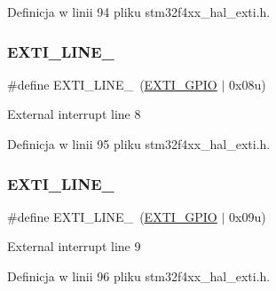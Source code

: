 Definicja w linii 94 pliku stm32f4xx\+\_\+hal\+\_\+exti.\+h.

\mbox{\label{group___e_x_t_i___line_ga0bb9322e3cfbe3a256f9e479ba3e5664}} 
\subsubsection{\texorpdfstring{E\+X\+T\+I\+\_\+\+L\+I\+N\+E\+\_}{EXTI\_LINE\_8}}
{\footnotesize\ttfamily \#define E\+X\+T\+I\+\_\+\+L\+I\+N\+E\+\_~(\hyperlink{group___e_x_t_i___private___constants_gacfa322960fc87db022536119cabb4d2a}{E\+X\+T\+I\+\_\+\+G\+P\+IO}       $\vert$ 0x08u)}

External interrupt line 8 

Definicja w linii 95 pliku stm32f4xx\+\_\+hal\+\_\+exti.\+h.

\mbox{\label{group___e_x_t_i___line_ga714a1411d5dc8bcf6b6efe69396fbccf}} 
\subsubsection{\texorpdfstring{E\+X\+T\+I\+\_\+\+L\+I\+N\+E\+\_}{EXTI\_LINE\_9}}
{\footnotesize\ttfamily \#define E\+X\+T\+I\+\_\+\+L\+I\+N\+E\+\_~(\hyperlink{group___e_x_t_i___private___constants_gacfa322960fc87db022536119cabb4d2a}{E\+X\+T\+I\+\_\+\+G\+P\+IO}       $\vert$ 0x09u)}

External interrupt line 9 

Definicja w linii 96 pliku stm32f4xx\+\_\+hal\+\_\+exti.\+h.


